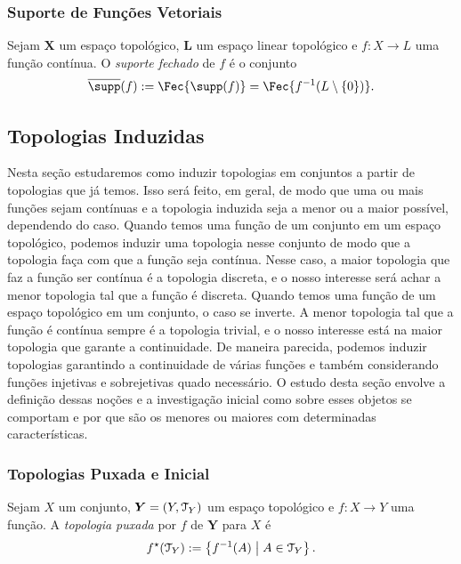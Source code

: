 \subsubsection{Suporte de Funções Vetoriais}

\begin{defi}
Sejam $\bm X$ um espaço topológico, $\bm L$ um espaço linear topológico e $f\colon X \to L$ uma função contínua. O \emph{suporte fechado} de $f$ é o conjunto
	\begin{equation*}
	\overline\supp(f) := \Fec{\supp(f)} = \Fec{f\inv(L \setminus \{0\})}.
	\end{equation*}
\end{defi}

\subsection{Topologias Induzidas}

Nesta seção estudaremos como induzir topologias em conjuntos a partir de topologias que já temos. Isso será feito, em geral, de modo que uma ou mais funções sejam contínuas e a topologia induzida seja a menor ou a maior possível, dependendo do caso. Quando temos uma função de um conjunto em um espaço topológico, podemos induzir uma topologia nesse conjunto de modo que a topologia faça com  que a função seja contínua. Nesse caso, a maior topologia que faz a função ser contínua é a topologia discreta, e o nosso interesse será achar a menor topologia tal que a função é discreta. Quando temos uma função de um espaço topológico em um conjunto, o caso se inverte. A menor topologia tal que a função é contínua sempre é a topologia trivial, e o nosso interesse está na maior topologia que garante a continuidade. De maneira parecida, podemos induzir topologias garantindo a continuidade de várias funções e também considerando funções injetivas e sobrejetivas quado necessário. O estudo desta seção envolve a definição dessas noções e a investigação inicial como sobre esses objetos se comportam e por que são os menores ou maiores com determinadas características.

\subsubsection{Topologias Puxada e Inicial}

\begin{defi}
Sejam $X$ um conjunto, $\bm Y = (Y,\mathcal{T}_Y)$ um espaço topológico e $f: X \to Y$ uma função. A \emph{topologia puxada} por $f$ de $\bm Y$ para $X$ é
	\begin{equation*}
	f^\star(\mathcal{T}_Y) := \left\{f^{-1}(A) \;\middle\vert\; A \in \mathcal{T}_Y \right\}.
	\end{equation*}
\end{defi}


